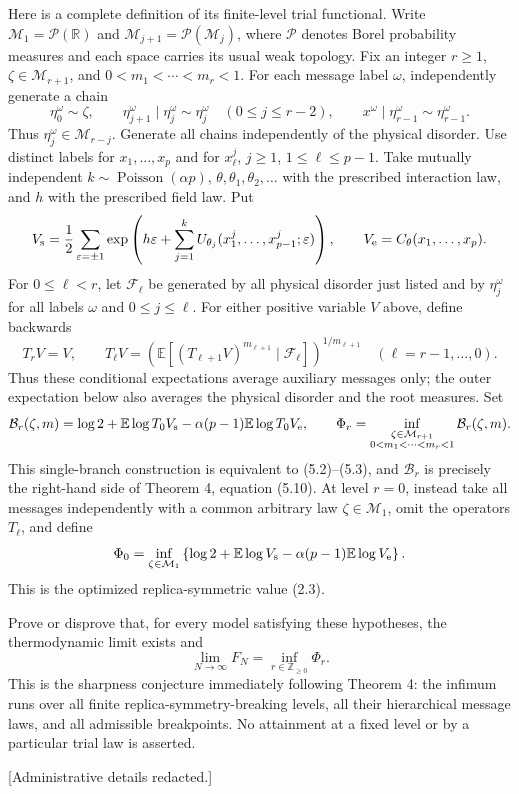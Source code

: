 \documentclass[11pt,letterpaper]{article}
\begin{document}
\begin{PromptQuote}
Here is a complete definition of its finite-level trial functional. Write $\mathcal M_1=\mathcal P(\mathbb R)$ and $\mathcal M_{j+1}=\mathcal P(\mathcal M_j)$, where $\mathcal P$ denotes Borel probability measures and each space carries its usual weak topology. Fix an integer $r\ge1$, $\zeta\in\mathcal M_{r+1}$, and $0<m_1<\cdots<m_r<1$. For each message label $\omega$, independently generate a chain
$$
\eta_0^\omega\sim\zeta,\qquad
\eta_{j+1}^\omega\mid\eta_j^\omega\sim\eta_j^\omega\quad(0\le j\le r-2),\qquad
x^\omega\mid\eta_{r-1}^\omega\sim\eta_{r-1}^\omega.
$$
Thus $\eta_j^\omega\in\mathcal M_{r-j}$. Generate all chains independently of the physical disorder. Use distinct labels for $x_1,\ldots,x_p$ and for $x_\ell^j$, $j\ge1$, $1\le\ell\le p-1$. Take mutually independent $k\sim\operatorname{Poisson}(\alpha p)$, $\theta,\theta_1,\theta_2,\ldots$ with the prescribed interaction law, and $h$ with the prescribed field law. Put
$$
V_{\rm s}=\frac12\sum_{\varepsilon=\pm1}\exp\left(h\varepsilon+\sum_{j=1}^k U_{\theta_j}(x_1^j,\ldots,x_{p-1}^j;\varepsilon)\right),\qquad
V_{\rm e}=C_\theta(x_1,\ldots,x_p).
$$
For $0\le\ell<r$, let $\mathcal F_\ell$ be generated by all physical disorder just listed and by $\eta_j^\omega$ for all labels $\omega$ and $0\le j\le\ell$. For either positive variable $V$ above, define backwards
$$
T_rV=V,\qquad
T_\ell V=\left(\mathbb E\left[(T_{\ell+1}V)^{m_{\ell+1}}\mid\mathcal F_\ell\right]\right)^{1/m_{\ell+1}}
\quad(\ell=r-1,\ldots,0).
$$
Thus these conditional expectations average auxiliary messages only; the outer expectation below also averages the physical disorder and the root measures. Set
$$
\mathcal B_r(\zeta,m)=\log2+\mathbb E\log T_0V_{\rm s}-\alpha(p-1)\mathbb E\log T_0V_{\rm e},\qquad
\Phi_r=\inf_{\substack{\zeta\in\mathcal M_{r+1}\\0<m_1<\cdots<m_r<1}}\mathcal B_r(\zeta,m).
$$
This single-branch construction is equivalent to (5.2)--(5.3), and $\mathcal B_r$ is precisely the right-hand side of Theorem 4, equation (5.10). At level $r=0$, instead take all messages independently with a common arbitrary law $\zeta\in\mathcal M_1$, omit the operators $T_\ell$, and define
$$
\Phi_0=\inf_{\zeta\in\mathcal M_1}\left\{\log2+\mathbb E\log V_{\rm s}-\alpha(p-1)\mathbb E\log V_{\rm e}\right\}.
$$
This is the optimized replica-symmetric value (2.3).

Prove or disprove that, for every model satisfying these hypotheses, the thermodynamic limit exists and
$$
\lim_{N\to\infty}F_N=\inf_{r\in\mathbb Z_{\ge0}}\Phi_r.
$$
This is the sharpness conjecture immediately following Theorem 4: the infimum runs over all finite replica-symmetry-breaking levels, all their hierarchical message laws, and all admissible breakpoints. No attainment at a fixed level or by a particular trial law is asserted.

[Administrative details redacted.]
\end{PromptQuote}
\end{document}
